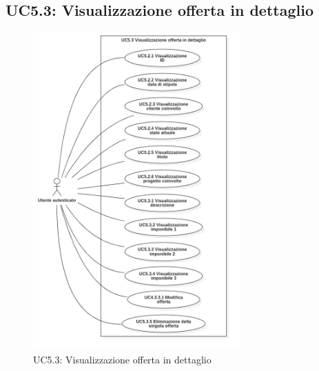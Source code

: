 \subsection{UC5.3: Visualizzazione offerta in dettaglio}
\begin{figure}[!h]
\centering
\includegraphics[width=300px]{../images/UC/.jpeg/UC5.3.0-visualizzazioneDettaglioOfferta.jpg}
\caption{UC5.3: Visualizzazione offerta in dettaglio}
\end{figure}

